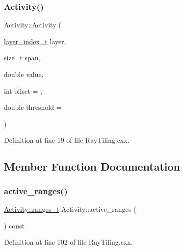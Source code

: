 \subsubsection{\texorpdfstring{Activity()}{Activity()}\hspace{0.1cm}{\footnotesize\ttfamily [3/3]}}
{\footnotesize\ttfamily Activity\+::\+Activity (\begin{DoxyParamCaption}\item[{\hyperlink{namespace_wire_cell_1_1_ray_grid_ab7562e54b58eede813d5b70b5eb85812}{layer\+\_\+index\+\_\+t}}]{layer,  }\item[{size\+\_\+t}]{span,  }\item[{double}]{value,  }\item[{int}]{offset = {},  }\item[{double}]{threshold = {} }\end{DoxyParamCaption})}



Definition at line 19 of file Ray\+Tiling.\+cxx.



\subsection{Member Function Documentation}
\mbox{\label{class_wire_cell_1_1_ray_grid_1_1_activity_aae8ad1d5d95c9f5f4668975db2b68f3b}} 
\subsubsection{\texorpdfstring{active\+\_\+ranges()}{active\_ranges()}}
{\footnotesize\ttfamily \hyperlink{class_wire_cell_1_1_ray_grid_1_1_activity_ac1614e7c72c06f7be7c03a80a25b024b}{Activity\+::ranges\+\_\+t} Activity\+::active\+\_\+ranges (\begin{DoxyParamCaption}{ }\end{DoxyParamCaption}) const}



Definition at line 102 of file Ray\+Tiling.\+cxx.

